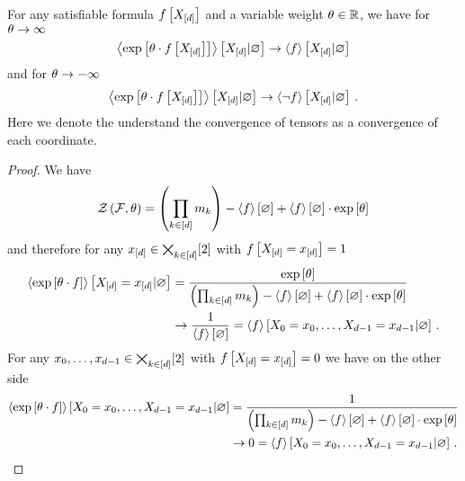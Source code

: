 \begin{lemma}
	For any satisfiable formula $f\left[X_{[d]}\right]$ and a variable weight $\theta\in\mathbb{R}$, we have for $\theta\rightarrow\infty$
	\begin{align*}
		\left\langle \mathrm{exp}\left[\theta\cdot f\left[X_{[d]}\right]\right]\right\rangle \left[ X_{[d]} | \varnothing \right] \rightarrow \left\langle f\right\rangle \left[ X_{[d]} | \varnothing \right]
	\end{align*}
	and for $\theta\rightarrow-\infty$
	\begin{align*}
		\left\langle \mathrm{exp}\left[\theta\cdot f\left[X_{[d]}\right]\right]\right\rangle \left[ X_{[d]} | \varnothing \right] \rightarrow \left\langle \lnot f\right\rangle \left[ X_{[d]} | \varnothing \right] \, .
	\end{align*}
	Here we denote the understand the convergence of tensors as a convergence of each coordinate.
\end{lemma}
\begin{proof}
	We have 
	\begin{align*}
		\mathcal{Z}\left(\mathcal{F},\theta\right) = \left(\prod_{k\in[d]} m_{k}\right) - \left\langle f\right\rangle \left[ \varnothing \right] + \left\langle f\right\rangle \left[ \varnothing \right] \cdot \mathrm{exp}\left[\theta\right]
	\end{align*}
	and therefore for any $x_{[d]}\in\bigtimes_{k\in[d]}[2]$ with $f\left[X_{[d]}=x_{[d]}\right]=1$
	\begin{align*}
		\left\langle \mathrm{exp}\left[\theta\cdot f\right]\right\rangle \left[ X_{[d]}=x_{[d]} | \varnothing \right]
		&= \frac{
			\mathrm{exp}\left[\theta\right]
			}{
			\left(\prod_{k\in[d]} m_{k} \right) - \left\langle f\right\rangle \left[ \varnothing \right] + \left\langle f\right\rangle \left[ \varnothing \right] \cdot \mathrm{exp}\left[\theta\right]
			} \\
		& \rightarrow \frac{1}{\left\langle f\right\rangle \left[ \varnothing \right]} 
		= \left\langle f\right\rangle \left[ X_{0}=x_{0},\ldots,X_{d-1}=x_{d-1} | \varnothing \right] \, . 
	\end{align*}
	For any ${x_{0},\ldots,x_{d-1}}\in\bigtimes_{k\in[d]}[2]$ with $f\left[X_{[d]}=x_{[d]}\right]=0$ we have on the other side
	\begin{align*}
		\left\langle \mathrm{exp}\left[\theta\cdot f\right]\right\rangle \left[ X_{0}=x_{0},\ldots,X_{d-1}=x_{d-1} | \varnothing \right]
		&= \frac{
			1
			}{
			\left(\prod_{k\in[d]} m_{k}\right) - \left\langle f\right\rangle \left[ \varnothing \right] + \left\langle f\right\rangle \left[ \varnothing \right] \cdot \mathrm{exp}\left[\theta\right]
			} \\
		& \rightarrow 0
		= \left\langle f\right\rangle \left[ X_{0}=x_{0},\ldots,X_{d-1}=x_{d-1} | \varnothing \right] \, . 
	\end{align*}
\end{proof}



